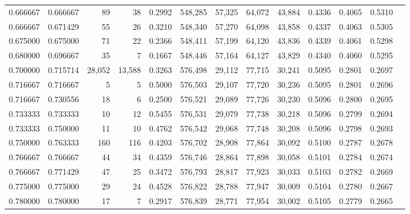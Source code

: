 \begin{tabular}{rrrrrrrrrrrrr}
0.666667 & 0.666667 &     89 &     38 &                                     0.2992 & 548,285 &  57,325 &  64,072 &  43,884 & 0.4336 & 0.4065 & 0.5310 \\
0.666667 & 0.671429 &     55 &     26 &                                     0.3210 & 548,340 &  57,270 &  64,098 &  43,858 & 0.4337 & 0.4063 & 0.5305 \\
0.675000 & 0.675000 &     71 &     22 &                                     0.2366 & 548,411 &  57,199 &  64,120 &  43,836 & 0.4339 & 0.4061 & 0.5298 \\
0.680000 & 0.696667 &     35 &      7 &                                     0.1667 & 548,446 &  57,164 &  64,127 &  43,829 & 0.4340 & 0.4060 & 0.5295 \\
0.700000 & 0.715714 & 28,052 & 13,588 &                                     0.3263 & 576,498 &  29,112 &  77,715 &  30,241 & 0.5095 & 0.2801 & 0.2697 \\
0.716667 & 0.716667 &      5 &      5 &                                     0.5000 & 576,503 &  29,107 &  77,720 &  30,236 & 0.5095 & 0.2801 & 0.2696 \\
0.716667 & 0.730556 &     18 &      6 &                                     0.2500 & 576,521 &  29,089 &  77,726 &  30,230 & 0.5096 & 0.2800 & 0.2695 \\
0.733333 & 0.733333 &     10 &     12 &                                     0.5455 & 576,531 &  29,079 &  77,738 &  30,218 & 0.5096 & 0.2799 & 0.2694 \\
0.733333 & 0.750000 &     11 &     10 &                                     0.4762 & 576,542 &  29,068 &  77,748 &  30,208 & 0.5096 & 0.2798 & 0.2693 \\
0.750000 & 0.763333 &    160 &    116 &                                     0.4203 & 576,702 &  28,908 &  77,864 &  30,092 & 0.5100 & 0.2787 & 0.2678 \\
0.766667 & 0.766667 &     44 &     34 &                                     0.4359 & 576,746 &  28,864 &  77,898 &  30,058 & 0.5101 & 0.2784 & 0.2674 \\
0.766667 & 0.771429 &     47 &     25 &                                     0.3472 & 576,793 &  28,817 &  77,923 &  30,033 & 0.5103 & 0.2782 & 0.2669 \\
0.775000 & 0.775000 &     29 &     24 &                                     0.4528 & 576,822 &  28,788 &  77,947 &  30,009 & 0.5104 & 0.2780 & 0.2667 \\
0.780000 & 0.780000 &     17 &      7 &                                     0.2917 & 576,839 &  28,771 &  77,954 &  30,002 & 0.5105 & 0.2779 & 0.2665 \\

\end{tabular}

